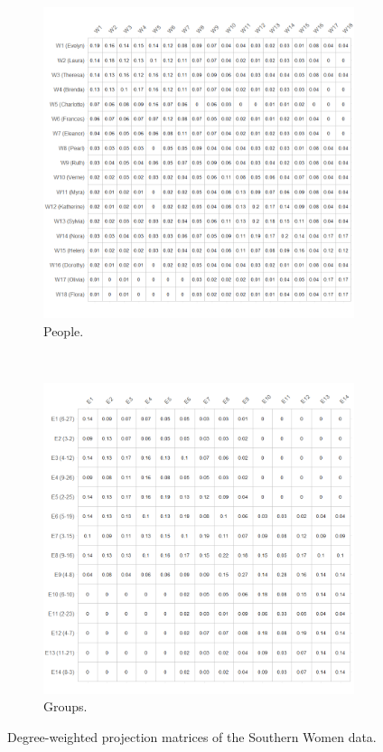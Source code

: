 \documentclass[a4paper,fleqn]{cas-sc}
\begin{document}
\begin{figure}[ht!]
    \captionsetup[subfigure]{font=footnotesize,labelfont=footnotesize}
    \centering
     \begin{subfigure}[b]{0.55\textwidth}
        \includegraphics[width=1.0\textwidth]{Plots/p-norm.png}
            \caption{People.}
            \label{fig:p-dwproj}
    \end{subfigure} \\
     \begin{subfigure}[b]{0.55\textwidth}
        \includegraphics[width=1.0\textwidth]{Plots/g-norm.png}
            \caption{Groups.}
            \label{fig:g-dwproj}
    \end{subfigure}
    \caption{Degree-weighted projection matrices of the Southern Women data.}
    \label{fig:dwproj}
\end{figure}
\end{document}
